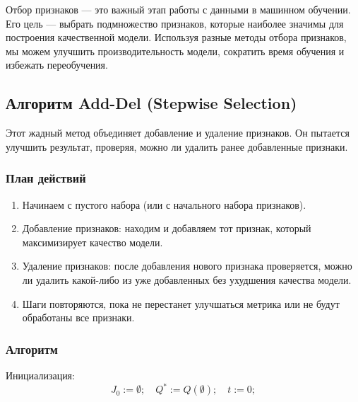 Отбор признаков — это важный этап работы с данными в машинном обучении. Его цель — выбрать подмножество признаков, которые наиболее значимы для построения качественной модели. Используя разные методы отбора признаков, мы можем улучшить производительность модели, сократить время обучения и избежать переобучения. 




\subsection*{Алгоритм Add-Del (Stepwise Selection)}

Этот жадный метод объединяет добавление и удаление признаков. Он пытается улучшить результат, проверяя, можно ли удалить ранее добавленные признаки.

\subsubsection*{План действий}

\begin{enumerate}

\item Начинаем с пустого набора (или с начального набора признаков).

\item Добавление признаков: находим и добавляем тот признак, который максимизирует качество модели.

\item Удаление признаков: после добавления нового признака проверяется, можно ли удалить какой-либо из уже добавленных без ухудшения качества модели.

\item Шаги повторяются, пока не перестанет улучшаться метрика или не будут обработаны все признаки.

\end{enumerate}


\subsubsection*{Алгоритм}


Инициализация:
\[
J_0 := \emptyset; \quad Q^* := Q(\emptyset); \quad t := 0;
\]

